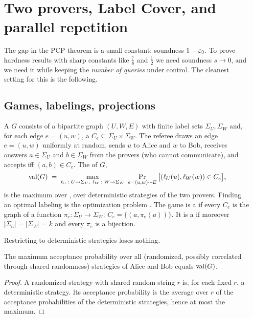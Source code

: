 \section{Two provers, Label Cover, and parallel repetition}
\label{sec:games}

The gap in the PCP theorem is a small constant: soundness $1-\varepsilon_0$.  To prove hardness
results with sharp constants like $\tfrac78$ and $\tfrac12$ we need soundness $s\to0$, and
we need it while keeping the \emph{number of queries} under control.  The cleanest setting for
this is the following.

\subsection{Games, labelings, projections}

\begin{definition}\label{def:game}
A  $G$ consists of a bipartite graph $(U,W,E)$ with finite
label sets $\Sigma_U,\Sigma_W$ and, for each edge $e=(u,w)$, a 
$C_e\subseteq\Sigma_U\times\Sigma_W$.  The referee draws an edge $e=(u,w)$ uniformly at random,
sends $u$ to Alice and $w$ to Bob, receives answers $a\in\Sigma_U$ and $b\in\Sigma_W$ from
the provers (who cannot communicate), and accepts iff $(a,b)\in C_e$.  The  of $G$,
\[
  \operatorname{val}(G)\;=\;\max_{\ell_U\colon U\to\Sigma_U,\ \ell_W\colon W\to\Sigma_W}\ \Pr_{e=(u,w)\sim E}\big[(\ell_U(u),\ell_W(w))\in C_e\big],
\]
is the maximum over , \ie over deterministic strategies of the two provers.
Finding an optimal labeling is the optimization problem .  The game is a
 if every $C_e$ is the graph of a function $\pi_e\colon\Sigma_U\to\Sigma_W$:
$C_e=\{(a,\pi_e(a))\}$.  It is a  if moreover $|\Sigma_U|=|\Sigma_W|=k$
and every $\pi_e$ is a bijection.
\end{definition}

Restricting to deterministic strategies loses nothing.

\begin{lemma}\label{lem:determ}
The maximum acceptance probability over all (randomized, possibly correlated through shared
randomness) strategies of Alice and Bob equals $\operatorname{val}(G)$.
\end{lemma}
\begin{proof}
A randomized strategy with shared random string $r$ is, for each fixed $r$, a deterministic
strategy.  Its acceptance probability is the average over $r$ of the acceptance probabilities of
the deterministic strategies, hence at most the maximum.
\end{proof}

